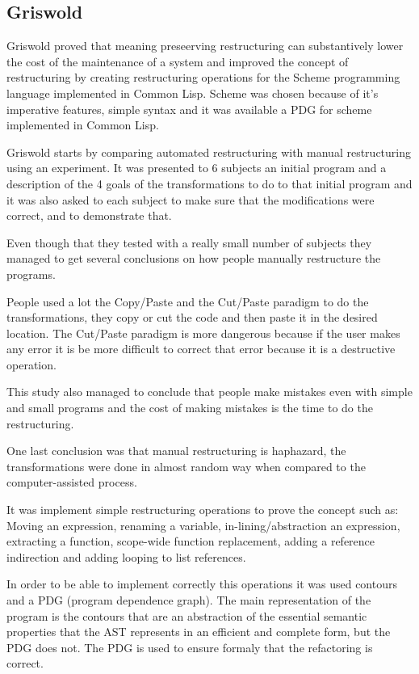 
\subsection{Griswold}
Griswold \cite{griswold1991program} proved that meaning preseerving restructuring can substantively lower the cost of the maintenance of a system and improved the concept of restructuring by creating restructuring operations for the Scheme programming language implemented in Common Lisp. Scheme was chosen because of it's imperative features, simple syntax and it was available a PDG for scheme implemented in Common Lisp.


Griswold starts by comparing automated restructuring with manual restructuring using an experiment. It was presented to 6 subjects an initial program and a description of the 4 goals of the transformations to do to that initial program and it was also asked to each subject to make sure that the modifications were correct, and to demonstrate that. 

Even though that they tested with a really small number of subjects they managed to get several conclusions on how people manually restructure the programs.


People used a lot the Copy/Paste and the Cut/Paste paradigm to do the transformations, they copy or cut the code and then paste it in the desired location.
The Cut/Paste paradigm is more dangerous because if the user makes any error it is be more difficult to correct that error because it is a destructive operation.


This study also managed to conclude that people make mistakes even with simple and small programs and the cost of making mistakes is the time to do the restructuring.

One last conclusion was that manual restructuring is haphazard, the transformations were done in almost random way when compared to the computer-assisted process.


It was implement simple restructuring operations to prove the concept such as: Moving an expression, renaming a variable, in-lining/abstraction an expression, extracting a function, scope-wide function replacement, adding a reference indirection and adding looping to list references.


In order to be able to implement correctly this operations it was used contours and a PDG (program dependence graph). The main representation of the program is the contours that are an abstraction of the essential semantic properties that the AST represents in an efficient and complete form, but the PDG does not.
The PDG is used to ensure formaly that the refactoring is correct.

